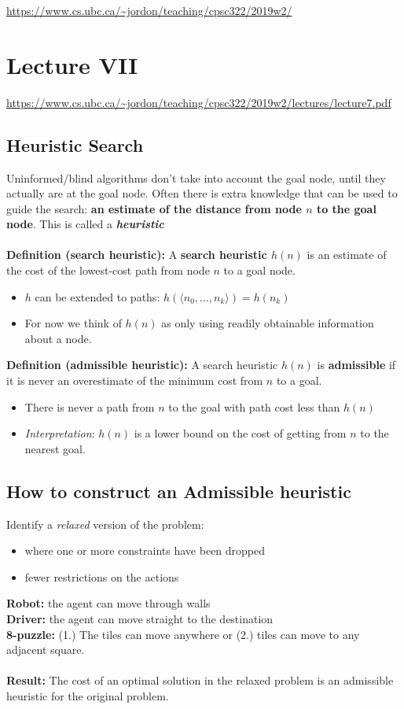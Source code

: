 \documentclass{article}
\theoremstyle{definition}
\begin{document}
\noindent \url{https://www.cs.ubc.ca/~jordon/teaching/cpsc322/2019w2/}
\section*{Lecture VII}
\url{https://www.cs.ubc.ca/~jordon/teaching/cpsc322/2019w2/lectures/lecture7.pdf}

\subsection*{Heuristic Search}
Uninformed/blind algorithms don't take into account the goal node, until they actually are at the goal node. Often there is extra knowledge that can be used to guide the search: \textbf{{\color{blue} an estimate of the distance from node $ n $ to the goal node}}. This is called a \textbf{\textsl{{\color{blue} heuristic}}} \\ \\
\textbf{Definition (search heuristic):} 
A \textbf{{\color{blue} search heuristic $ h(n) $}} is an estimate of the cost of the lowest-cost path from node $ n $ to a goal node.
\begin{itemize}
	\item $ h $ can be extended to paths: $ h( \langle n_0, ..., n_k \rangle ) = h(n_k) $
	\item For now we think of $ h(n) $ as only using readily obtainable information about a node. 
\end{itemize}
\textbf{Definition (admissible heuristic):} A search heuristic $ h(n) $ is \textbf{{\color{blue} admissible}} if it is never an overestimate of the minimum cost from $ n $ to a goal.
\begin{itemize}
	\item There is never a path from $ n $ to the goal with path cost less than $ h(n) $
	\item \textit{Interpretation}: $ h(n) $ is a lower bound on the cost of getting from $ n $ to the nearest goal. 
\end{itemize}

\subsection*{How to construct an Admissible heuristic}
Identify a {\color{blue} \textit{relaxed} version of the problem}:
\begin{itemize}
	\item where one or more constraints have been dropped
	\item fewer restrictions on the actions
\end{itemize}
\textbf{Robot:} the agent {\color{blue} can move through walls}\\
\textbf{Driver:} the agent {\color{blue} can move straight to the destination}\\
\textbf{8-puzzle:} (1.) The tiles {\color{blue} can move anywhere} or (2.) tiles can move to {\color{blue} any adjacent square}. \\ \\
\textbf{\color{OliveGreen} Result:} The cost of an optimal solution in the relaxed problem is an admissible heuristic for the original problem. 
\end{document}
